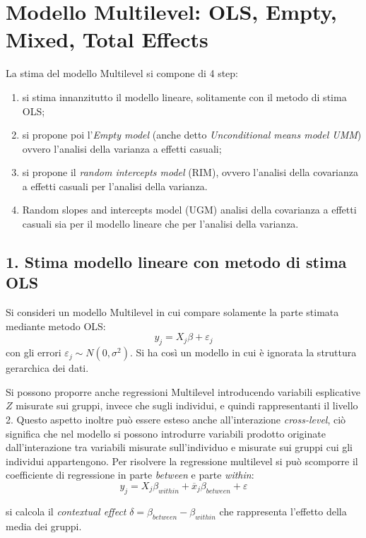 \documentclass[a4page, 11pt]{article} %
\begin{document}
\section{Modello Multilevel: OLS, Empty, Mixed, Total Effects}
La stima del modello Multilevel si compone di 4 step:
\begin{enumerate}[noitemsep]
\item si stima innanzitutto il modello lineare, solitamente con il metodo di stima OLS;
\item si propone poi l'\textit{Empty model} (anche detto \textit{Unconditional means model UMM}) ovvero l’analisi della varianza a effetti casuali;
\item si propone il \textit{random intercepts model} (RIM), ovvero l’analisi della covarianza a effetti casuali per l’analisi della varianza.
\item Random slopes and intercepts model (UGM) analisi della covarianza a effetti casuali sia per il modello lineare che per l’analisi della varianza.
\end{enumerate}

\subsection*{1. Stima modello lineare con metodo di stima OLS}
Si consideri un modello Multilevel in cui compare solamente la parte stimata mediante metodo OLS:
\begin{equation*}
  y_j = X_j \beta + \varepsilon_j
\end{equation*}
con gli errori $\varepsilon_j \sim N(0, \sigma^2)$.
Si ha così un modello in cui è ignorata la struttura gerarchica dei dati.

Si possono proporre anche regressioni Multilevel introducendo variabili esplicative $Z$ misurate sui gruppi, invece che sugli individui, e quindi rappresentanti il livello 2.
Questo aspetto inoltre può essere esteso anche all'interazione \textit{cross-level}, ciò significa che nel modello si possono introdurre variabili prodotto originate dall'interazione tra variabili misurate sull'individuo e misurate sui gruppi cui gli individui appartengono.
Per risolvere la regressione multilevel si può scomporre il coefficiente di regressione in parte \textit{between} e parte \textit{within}: 
\begin{equation*}
y_j = X_j \beta_{within} +\overline{x}_j\beta_{between} +\varepsilon
\end{equation*}

si calcola il \textit{contextual effect} $\delta = \beta_{between} - \beta_{within}$ che rappresenta l'effetto della media dei gruppi.
\end{document}
